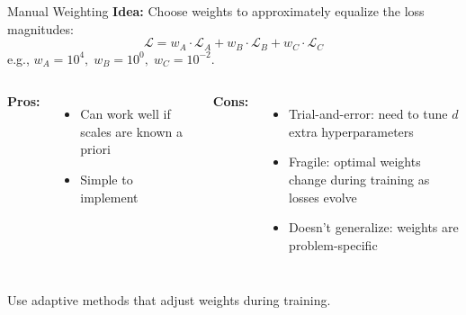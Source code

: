 \documentclass[aspectratio=169,11pt]{beamer}
\newcommand{\emphc}[1]{\textcolor{harvardcrimson}{#1}}
\begin{document}
\begin{frame}{Manual Weighting}
\textbf{Idea:} Choose weights to approximately equalize the loss magnitudes:
\[
    \mathcal{L} = w_A \cdot \mathcal{L}_A + w_B \cdot \mathcal{L}_B + w_C \cdot \mathcal{L}_C
\]
e.g., $w_A = 10^4,\; w_B = 10^0,\; w_C = 10^{-2}$.

\vspace{0.3cm}
\begin{columns}[T]
\textbf{Pros:}
\begin{itemize}
    \item Can work well if scales are known a priori
    \item Simple to implement
\end{itemize}

\textbf{Cons:}
\begin{itemize}
    \item \emphc{Trial-and-error}: need to tune $d$ extra hyperparameters
    \item \emphc{Fragile}: optimal weights change during training as losses evolve
    \item \emphc{Doesn't generalize}: weights are problem-specific
\end{itemize}
\end{columns}

\vspace{0.2cm}
\begin{alertblock}{Use adaptive methods that adjust weights during training.}
\end{alertblock}
\end{frame}
\end{document}
